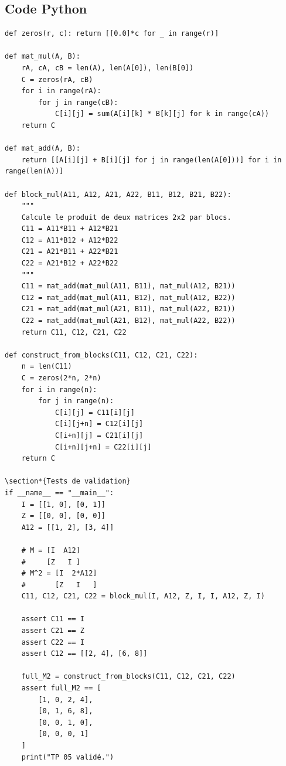\documentclass{report}
\begin{document}
\subsection*{Code Python}
\begin{verbatim}
def zeros(r, c): return [[0.0]*c for _ in range(r)]

def mat_mul(A, B):
    rA, cA, cB = len(A), len(A[0]), len(B[0])
    C = zeros(rA, cB)
    for i in range(rA):
        for j in range(cB):
            C[i][j] = sum(A[i][k] * B[k][j] for k in range(cA))
    return C

def mat_add(A, B):
    return [[A[i][j] + B[i][j] for j in range(len(A[0]))] for i in range(len(A))]

def block_mul(A11, A12, A21, A22, B11, B12, B21, B22):
    """
    Calcule le produit de deux matrices 2x2 par blocs.
    C11 = A11*B11 + A12*B21
    C12 = A11*B12 + A12*B22
    C21 = A21*B11 + A22*B21
    C22 = A21*B12 + A22*B22
    """
    C11 = mat_add(mat_mul(A11, B11), mat_mul(A12, B21))
    C12 = mat_add(mat_mul(A11, B12), mat_mul(A12, B22))
    C21 = mat_add(mat_mul(A21, B11), mat_mul(A22, B21))
    C22 = mat_add(mat_mul(A21, B12), mat_mul(A22, B22))
    return C11, C12, C21, C22

def construct_from_blocks(C11, C12, C21, C22):
    n = len(C11)
    C = zeros(2*n, 2*n)
    for i in range(n):
        for j in range(n):
            C[i][j] = C11[i][j]
            C[i][j+n] = C12[i][j]
            C[i+n][j] = C21[i][j]
            C[i+n][j+n] = C22[i][j]
    return C

\section*{Tests de validation}
if __name__ == "__main__":
    I = [[1, 0], [0, 1]]
    Z = [[0, 0], [0, 0]]
    A12 = [[1, 2], [3, 4]]

    # M = [I  A12]
    #     [Z   I ]
    # M^2 = [I  2*A12]
    #       [Z   I   ]
    C11, C12, C21, C22 = block_mul(I, A12, Z, I, I, A12, Z, I)

    assert C11 == I
    assert C21 == Z
    assert C22 == I
    assert C12 == [[2, 4], [6, 8]]

    full_M2 = construct_from_blocks(C11, C12, C21, C22)
    assert full_M2 == [
        [1, 0, 2, 4],
        [0, 1, 6, 8],
        [0, 0, 1, 0],
        [0, 0, 0, 1]
    ]
    print("TP 05 validé.")
\end{verbatim}
\end{document}
